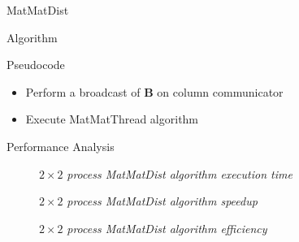 \begin{chapter}{MatMatDist}
\begin{section}{Algorithm}
\begin{subsection}{Pseudocode}
\begin{itemize}
                \item Perform a broadcast of $\mathbf{B}$ on column communicator
                \item Execute MatMatThread algorithm
            \end{itemize}
            
        \end{subsection}
        \clearpage
        \begin{subsection}{Performance Analysis}
            \begin{figure}[ht]
                \centering
                
                \caption{$2 \times 2$ \emph{process MatMatDist algorithm execution time}}
                \label{fig:matmatdist-exectime}
            \end{figure}
            \begin{figure}[ht]
                \centering
                
                \caption{$2 \times 2$ \emph{process MatMatDist algorithm speedup}}
                \label{fig:matmatdist-speedup}
            \end{figure}
            \begin{figure}[ht]
                \centering
                
                \caption{$2 \times 2$ \emph{process MatMatDist algorithm efficiency}}
                \label{fig:matmatdist-efficiency}
            \end{figure}
        \end{subsection}
    \end{section}
\end{chapter}